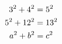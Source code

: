 \documentclass[nofonts]{ctexart}
\begin{document}
\begin{gather}
	3^2 + 4^2 = 5^2		\notag	\\
	5^2 + 12^2 = 13^2	\notag	\\
	a^2 + b^2 = c^2
\end{gather}
\end{document}
